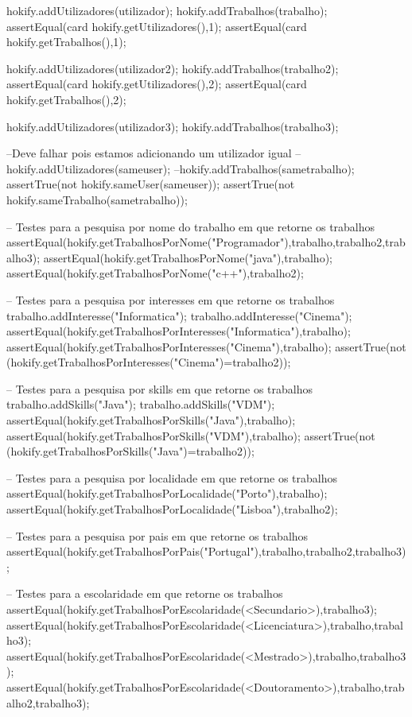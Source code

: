 \begin{vdmpp}[breaklines=true]
 hokify.addUtilizadores(utilizador);
 hokify.addTrabalhos(trabalho);
 assertEqual(card hokify.getUtilizadores(),1);
 assertEqual(card hokify.getTrabalhos(),1);
 
 hokify.addUtilizadores(utilizador2);
 hokify.addTrabalhos(trabalho2);
 assertEqual(card hokify.getUtilizadores(),2);
 assertEqual(card hokify.getTrabalhos(),2);
 
 hokify.addUtilizadores(utilizador3);
 hokify.addTrabalhos(trabalho3);
 
 --Deve falhar pois estamos adicionando um utilizador igual
 --hokify.addUtilizadores(sameuser);
 --hokify.addTrabalhos(sametrabalho);
 assertTrue(not hokify.sameUser(sameuser));
 assertTrue(not hokify.sameTrabalho(sametrabalho));
 
 -- Testes para a pesquisa por nome do trabalho em que retorne os trabalhos
 assertEqual(hokify.getTrabalhosPorNome("Programador"),{trabalho,trabalho2,trabalho3});
 assertEqual(hokify.getTrabalhosPorNome("java"),{trabalho});
 assertEqual(hokify.getTrabalhosPorNome("c++"),{trabalho2});
 
 -- Testes para a pesquisa por interesses em que retorne os trabalhos
 trabalho.addInteresse("Informatica");
 trabalho.addInteresse("Cinema");
 assertEqual(hokify.getTrabalhosPorInteresses("Informatica"),{trabalho});
 assertEqual(hokify.getTrabalhosPorInteresses("Cinema"),{trabalho});
 assertTrue(not (hokify.getTrabalhosPorInteresses("Cinema")={trabalho2}));
 
 -- Testes para a pesquisa por skills em que retorne os trabalhos
 trabalho.addSkills("Java");
 trabalho.addSkills("VDM");
 assertEqual(hokify.getTrabalhosPorSkills("Java"),{trabalho});
 assertEqual(hokify.getTrabalhosPorSkills("VDM"),{trabalho});
 assertTrue(not (hokify.getTrabalhosPorSkills("Java")={trabalho2}));
 
 -- Testes para a pesquisa por localidade em que retorne os trabalhos
 assertEqual(hokify.getTrabalhosPorLocalidade("Porto"),{trabalho});
 assertEqual(hokify.getTrabalhosPorLocalidade("Lisboa"),{trabalho2});
 
 -- Testes para a pesquisa por pais em que retorne os trabalhos
 assertEqual(hokify.getTrabalhosPorPais("Portugal"),{trabalho,trabalho2,trabalho3});
 
 -- Testes para a escolaridade em que retorne os trabalhos
 assertEqual(hokify.getTrabalhosPorEscolaridade(<Secundario>),{trabalho3});
 assertEqual(hokify.getTrabalhosPorEscolaridade(<Licenciatura>),{trabalho,trabalho3});
 assertEqual(hokify.getTrabalhosPorEscolaridade(<Mestrado>),{trabalho,trabalho3});
 assertEqual(hokify.getTrabalhosPorEscolaridade(<Doutoramento>),{trabalho,trabalho2,trabalho3});
 

\end{vdmpp}
